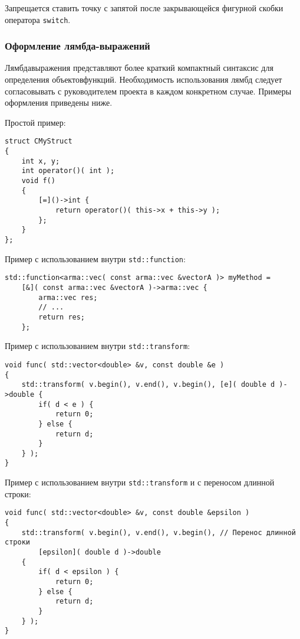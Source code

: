 {{{Запрещается ставить точку с запятой после закрывающейся фигурной скобки оператора \lstinline|switch|. 

\newpage
\subsubsection{Оформление лямбда-выражений}

Лямбда\sdash выражения представляют более краткий компактный синтаксис для определения объектов\sdash функций.
Необходимость использования лямбд следует согласовывать с руководителем проекта в каждом конкретном случае.
Примеры оформления приведены ниже.

Простой пример:
\begin{lstlisting}[frame=single]
struct CMyStruct
{
    int x, y;
    int operator()( int );
    void f()
    {
        [=]()->int {
            return operator()( this->x + this->y );
        };
    }
};
\end{lstlisting}

Пример с использованием внутри \lstinline|std::function|:
\begin{lstlisting}[frame=single]
std::function<arma::vec( const arma::vec &vectorA )> myMethod =
    [&]( const arma::vec &vectorA )->arma::vec {
        arma::vec res;
        // ...
        return res;
    };
\end{lstlisting}

Пример с использованием внутри \lstinline|std::transform|:
\begin{lstlisting}[frame=single]
void func( std::vector<double> &v, const double &e ) 
{
    std::transform( v.begin(), v.end(), v.begin(), [e]( double d )->double {
        if( d < e ) {
            return 0;
        } else {
            return d;
        }
    } );
}
\end{lstlisting}

\newpage

Пример с использованием внутри \lstinline|std::transform| и с переносом длинной строки:
\begin{lstlisting}[frame=single]
void func( std::vector<double> &v, const double &epsilon ) 
{
    std::transform( v.begin(), v.end(), v.begin(), // Перенос длинной строки
        [epsilon]( double d )->double 
    {
        if( d < epsilon ) {
	        return 0;
		} else {
		    return d;
		}
	} );
}
\end{lstlisting}

}}}
